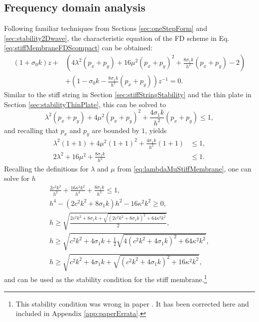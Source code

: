 {\subsection{Frequency domain analysis}\label{sec:stabilityStiffMembrane}
Following familiar techniques from Sections \ref{sec:oneStepForm} and \ref{sec:stability2Dwave}, the characteristic equation of the FD scheme in Eq. \eqref{eq:stiffMembraneFDScompact} can be obtained:
\begin{equation}
    \begin{aligned}
        (1+\sigma_0k)z + &\left(4\lambda^2 (p_x+p_y) + 16\mu^2(p_x+p_y)^2 + \frac{8\sigma_1k}{h^2}(p_x+p_y) - 2\right) \\
        &+ \left(1 - \sigma_0k - \frac{8\sigma_1k}{h^2}(p_x+p_y)\right)z^{-1} = 0.
    \end{aligned}
\end{equation}
Similar to the stiff string in Section \ref{sec:stiffStringStability} and the thin plate in Section \ref{sec:stabilityThinPlate}, this can be solved to 
\begin{equation*}
    \lambda^2(p_x+p_y) + 4\mu^2(p_x+p_y)^2 + \frac{4\sigma_1k}{h^2}(p_x+p_y) \leq 1,
\end{equation*}
and recalling that $p_x$ and $p_y$ are bounded by $1$, yields
\begin{align*}
    \lambda^2(1 + 1) + 4\mu^2(1+1)^2 + \frac{4\sigma_1k}{h^2}(1+1) &\leq 1,\\
    2\lambda^2 + 16\mu^2 + \frac{8\sigma_1k}{h^2} &\leq 1 .
\end{align*}
Recalling the definitions for $\lambda$ and $\mu$ from \eqref{eq:lambdaMuStiffMembrane}, one can solve for $h$ 
\begin{gather}
    \frac{2c^2k^2}{h^2}+ \frac{16\kappa^2k^2}{h^4} + \frac{8\sigma_1k}{h^2} \leq 1,\nonumber\\
    h^4 - (2c^2k^2 + 8\sigma_1k)h^2 - 16\kappa^2k^2 \geq 0,\nonumber\\
    h\geq \sqrt{\frac{2c^2k^2 + 8\sigma_1k+\sqrt{(2c^2k^2 + 8\sigma_1k)^2 + 64\kappa^2k^2}}{2}},\nonumber \\
    h\geq \sqrt{c^2k^2 + 4\sigma_1k+\frac{1}{2}\sqrt{4(c^2k^2 + 4\sigma_1k)^2 + 64\kappa^2k^2}},\nonumber\\
    h\geq \sqrt{c^2k^2 + 4\sigma_1k+\sqrt{(c^2k^2 + 4\sigma_1k)^2 + 16\kappa^2k^2}},
\end{gather}
and can be used as the stability condition for the stiff membrane.\footnote{This stability condition was wrong in paper \citeP[F]. It has been corrected here and included in Appendix \ref{app:paperErrata}.} 
}
